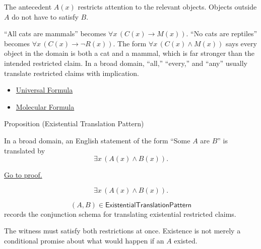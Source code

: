 \begin{remark*}[Interpretation]
The antecedent \(A(x)\) restricts attention to the relevant objects. Objects
outside \(A\) do not have to satisfy \(B\).
\end{remark*}

\begin{remark*}[Exposition]
``All cats are mammals'' becomes \(\forall x\,(C(x)\to M(x))\). ``No cats are
reptiles'' becomes \(\forall x\,(C(x)\to \neg R(x))\). The form
\(\forall x\,(C(x)\land M(x))\) says every object in the domain is both a cat
and a mammal, which is far stronger than the intended restricted claim. In a
broad domain, ``all,'' ``every,'' and ``any'' usually translate restricted
claims with implication.
\end{remark*}

\begin{dependencies}
\begin{itemize}
  \item \hyperref[def:universal-q]{Universal Formula}
  \item \hyperref[def:molecular]{Molecular Formula}
\end{itemize}
\end{dependencies}

\begin{propositionbox}{Proposition (Existential Translation Pattern)}
\begin{proposition}
\label{prop:existential-translation-pattern}
In a broad domain, an English statement of the form ``Some \(A\) are \(B\)''
is translated by
\[
\exists x\,(A(x)\land B(x)).
\]

\noindent\hyperref[prf:existential-translation-pattern]{Go to proof.}
\end{proposition}
\end{propositionbox}

\begin{remark*}
\[
\exists x\,(A(x)\land B(x)).
\]
\end{remark*}

\begin{remark*}
\[
  (A,B)\in\mathsf{ExistentialTranslationPattern}
\] records the conjunction
schema for translating existential restricted claims.
\end{remark*}

\begin{remark*}[Interpretation]
The witness must satisfy both restrictions at once. Existence is not merely a
conditional promise about what would happen if an \(A\) existed.
\end{remark*}

